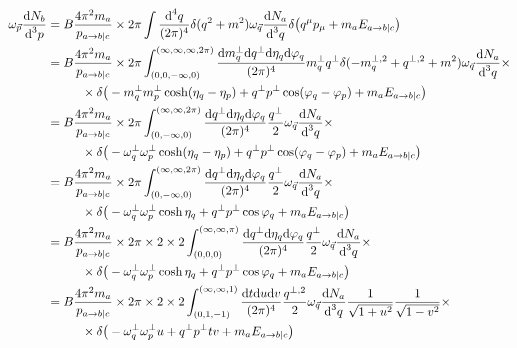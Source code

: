 \begin{subequations}
    \begin{align}
        \omega_{\vec{p}}\frac{\text{d} N_b}{\text{d}^3p}&=B\frac{4\pi^2m_a}{p_{a\rightarrow b\vert c}}\times2\pi\int\frac{\text{d}^4q}{(2\pi)^4}\delta(q^2+m^2)\omega_{\vec{q}}\frac{\text{d} N_a}{\text{d}^3 q}\delta\big(q^\mu p_\mu+m_a E_{a\rightarrow b\vert c}\big)\\
        &=B\frac{4\pi^2m_a}{p_{a\rightarrow b\vert c}}\times2\pi\int_{(0,0,-\infty,0)}^{(\infty,\infty,\infty,2\pi)}\frac{\text{d} m_q^\perp \text{d} q^\perp\text{d}\eta_q\text{d}\varphi_q}{(2\pi)^4}m_q^\perp q^\perp\delta(-m_q^{\perp,2}+q^{\perp,2}+m^2)\omega_{\vec{q}}\frac{\text{d} N_a}{\text{d}^3 q}\times\nonumber\\
        &\phantom{=}\qquad\times\delta\big(-m_q^\perp m_p^\perp\cosh(\eta_q-\eta_p)+q^\perp p^\perp\cos(\varphi_q-\varphi_p)+m_a E_{a\rightarrow b\vert c}\big)\\
        &=B\frac{4\pi^2m_a}{p_{a\rightarrow b\vert c}}\times2\pi\int_{(0,-\infty,0)}^{(\infty,\infty,2\pi)}\frac{\text{d} q^\perp\text{d}\eta_q\text{d}\varphi_q}{(2\pi)^4}\frac{q^\perp}{2}\omega_{\vec{q}}\frac{\text{d} N_a}{\text{d}^3 q}\times\nonumber\\
        &\phantom{=}\qquad\times\delta\big(-\omega_q^\perp \omega_p^\perp\cosh(\eta_q-\eta_p)+q^\perp p^\perp\cos(\varphi_q-\varphi_p)+m_a E_{a\rightarrow b\vert c}\big)\\
        &=B\frac{4\pi^2m_a}{p_{a\rightarrow b\vert c}}\times2\pi\int_{(0,-\infty,0)}^{(\infty,\infty,2\pi)}\frac{\text{d} q^\perp\text{d}\eta_q\text{d}\varphi_q}{(2\pi)^4}\frac{q^\perp}{2}\omega_{\vec{q}}\frac{\text{d} N_a}{\text{d}^3 q}\times\nonumber\\
        &\phantom{=}\qquad\times\delta\big(-\omega_q^\perp \omega_p^\perp\cosh\eta_q+q^\perp p^\perp\cos\varphi_q+m_a E_{a\rightarrow b\vert c}\big)\\
        &=B\frac{4\pi^2m_a}{p_{a\rightarrow b\vert c}}\times2\pi\times 2\times 2\int_{(0,0,0)}^{(\infty,\infty,\pi)}\frac{\text{d} q^\perp\text{d}\eta_q\text{d}\varphi_q}{(2\pi)^4}\frac{q^\perp}{2}\omega_{\vec{q}}\frac{\text{d} N_a}{\text{d}^3 q}\times\nonumber\\
        &\phantom{=}\qquad\times\delta\big(-\omega_q^\perp \omega_p^\perp\cosh\eta_q+q^\perp p^\perp\cos\varphi_q+m_a E_{a\rightarrow b\vert c}\big)\\
        &=B\frac{4\pi^2m_a}{p_{a\rightarrow b\vert c}}\times2\pi\times 2\times 2\int_{(0,1,-1)}^{(\infty,\infty,1)}\frac{\text{d} t\text{d} u\text{d} v}{(2\pi)^4}\frac{q^{\perp,2}}{2}\omega_{\vec{q}}\frac{\text{d} N_a}{\text{d}^3 q}\frac{1}{\sqrt{1+u^2}}\frac{1}{\sqrt{1-v^2}}\times\nonumber\\
        &\phantom{=}\qquad\times\delta\big(-\omega_q^\perp \omega_p^\perp u+q^\perp p^\perp tv+m_a E_{a\rightarrow b\vert c}\big)
    \end{align}
\end{subequations}
